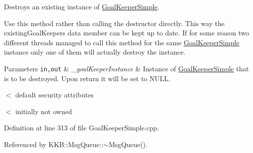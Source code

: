 Destroys an existing instance of \hyperlink{class_k_k_b_1_1_goal_keeper_simple}{Goal\+Keeper\+Simple}. 

Use this method rather than calling the destructor directly. This way the \textquotesingle{}existing\+Goal\+Keepers\textquotesingle{} data member can be kept up to date. If for some reason two different threads managed to call this method for the same \hyperlink{class_k_k_b_1_1_goal_keeper_simple}{Goal\+Keeper\+Simple} instance only one of them will actually destroy the instance. 
\begin{DoxyParams}[1]{Parameters}
\mbox{\tt in,out}  & {\em \+\_\+goal\+Keeper\+Instance} & Instance of \hyperlink{class_k_k_b_1_1_goal_keeper_simple}{Goal\+Keeper\+Simple} that is to be destroyed. Upon return it will be set to N\+U\+LL. \\
\hline
\end{DoxyParams}
$<$ default security attributes

$<$ initially not owned 

Definition at line 313 of file Goal\+Keeper\+Simple.\+cpp.



Referenced by K\+K\+B\+::\+Msg\+Queue\+::$\sim$\+Msg\+Queue().


